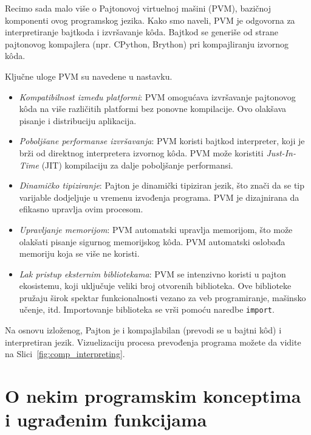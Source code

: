
Recimo sada malo više o Pajtonovoj virtuelnoj mašini (PVM), bazičnoj komponenti ovog programskog jezika. Kako smo naveli, PVM je odgovorna za interpretiranje bajtkoda i izvršavanje k\^oda. Bajtkod se generiše od strane pajtonovog kompajlera (npr. CPython, Brython) pri kompajliranju izvornog k\^oda.

Ključne uloge PVM su navedene u nastavku. 
\begin{itemize}
\item \textit{Kompatibilnost između platformi}: PVM omogućava izvršavanje pajtonovog k\^oda na više različitih platformi bez ponovne kompilacije. Ovo olakšava pisanje i distribuciju aplikacija.
\item \textit{Poboljšane performanse izvršavanja}: PVM koristi bajtkod  interpreter, koji je brži od direktnog interpretera izvornog k\^oda. PVM može koristiti \textit{Just-In-Time} (JIT) kompilaciju za dalje poboljšanje performansi.
\item \textit{Dinamičko tipiziranje}: Pajton je dinamički tipiziran jezik, što znači da se tip varijable dodjeljuje u vremenu izvođenja programa. PVM je dizajnirana da efikasno upravlja ovim procesom.
\item  \textit{Upravljanje memorijom}: PVM automatski upravlja memorijom, što može olakšati pisanje sigurnog memorijskog k\^oda. PVM  automatski oslobađa memoriju koja se više ne koristi.
\item \textit{Lak pristup eksternim bibliotekama}: PVM se intenzivno koristi u pajton ekosistemu, koji uključuje veliki broj otvorenih biblioteka. Ove biblioteke pružaju širok spektar funkcionalnosti vezano za  veb programiranje, mašinsko učenje, itd. Importovanje biblioteka se vrši pomoću naredbe \texttt{import}. 
\end{itemize}


Na osnovu izloženog, Pajton je i kompajlabilan (prevodi se u bajtni k\^od) i interpretiran jezik. 
Vizuelizaciju procesa prevođenja programa možete da vidite na Slici~\ref{fig:comp_interpreting}.


\section{O nekim programskim konceptima i ugrađenim funkcijama} \label{sec:concepts-pyhton}

